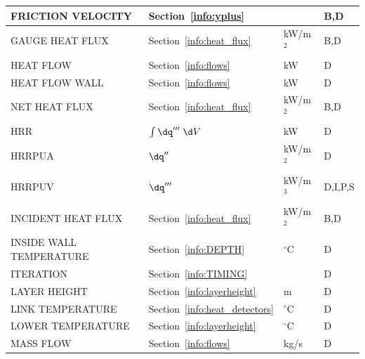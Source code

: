\documentclass[11pt]{book}
\begin{document}
\begin{longtable}{@{\extracolsep{\fill}}|l|l|l|l|}
{\ct FRICTION VELOCITY}                         & Section~\ref{info:yplus}                      &                & B,D          \\ \hline
{\ct GAUGE HEAT FLUX}                           & Section~\ref{info:heat_flux}                  & kW/m$^2$       & B,D          \\ \hline
{\ct HEAT FLOW}                                 & Section~\ref{info:flows}                      & kW             & D            \\ \hline
{\ct HEAT FLOW WALL}                            & Section~\ref{info:flows}                      & kW             & D            \\ \hline
{\ct NET HEAT FLUX}                             & Section~\ref{info:heat_flux}                  & kW/m$^2$       & B,D          \\ \hline
{\ct HRR}                                       & $\int \dq''' \; \d V$                         & kW             & D            \\ \hline
{\ct HRRPUA}                                    & $\dq''$                                       & kW/m$^2$       & D            \\ \hline
{\ct HRRPUV}                                    & $\dq'''$                                      & kW/m$^3$       & D,I,P,S      \\ \hline
{\ct INCIDENT HEAT FLUX}                        & Section~\ref{info:heat_flux}                  & kW/m$^2$       & B,D          \\ \hline
{\ct INSIDE WALL TEMPERATURE}                   & Section~\ref{info:DEPTH}                      & $^\circ$C      & D            \\ \hline
{\ct ITERATION}                                 & Section~\ref{info:TIMING}                     &                & D            \\ \hline
{\ct LAYER HEIGHT}                              & Section~\ref{info:layerheight}                & m              & D            \\ \hline
{\ct LINK TEMPERATURE}                          & Section~\ref{info:heat_detectors}             & $^\circ$C      & D            \\ \hline
{\ct LOWER TEMPERATURE}                         & Section~\ref{info:layerheight}                & $^\circ$C      & D            \\ \hline
{\ct MASS FLOW}                                 & Section~\ref{info:flows}                      & kg/s           & D            \\ \hline

\end{longtable}
\end{document}

